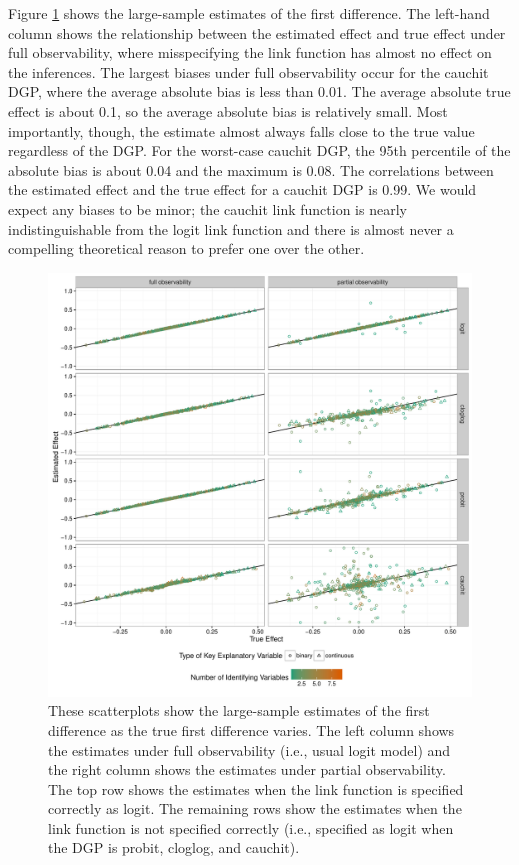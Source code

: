 \documentclass[10pt]{article}
\begin{document}
Figure \ref{fig:link} shows the large-sample estimates of the first difference. 
The left-hand column shows the relationship between the estimated effect and true effect under full observability, where misspecifying the link function has almost no effect on the inferences. 
The largest biases under full observability occur for the cauchit DGP, where the average absolute bias is less than 0.01. 
The average absolute true effect is about 0.1, so the average absolute bias is relatively small. 
Most importantly, though, the estimate almost always falls close to the true value regardless of the DGP. 
For the worst-case cauchit DGP, the 95th percentile of the absolute bias is about 0.04 and the maximum is 0.08. 
The correlations between the estimated effect and the true effect for a cauchit DGP is 0.99.
We would expect any biases to be minor; the cauchit link function is nearly indistinguishable from the logit link function and there is almost never a compelling theoretical reason to prefer one over the other. 

\begin{figure}[h]
\begin{center}
\includegraphics[scale = .6]{figs/link-sims-scatter.pdf}
\caption{These scatterplots show the large-sample estimates of the first difference as the true first difference varies. The left column shows the estimates under full observability (i.e., usual logit model) and the right column shows the estimates under partial observability. The top row shows the estimates when the link function is specified correctly as logit. The remaining rows show the estimates when the link function is not specified correctly (i.e., specified as logit when the DGP is probit, cloglog, and cauchit).}\label{fig:link}
\end{center}
\end{figure}
\end{document}
